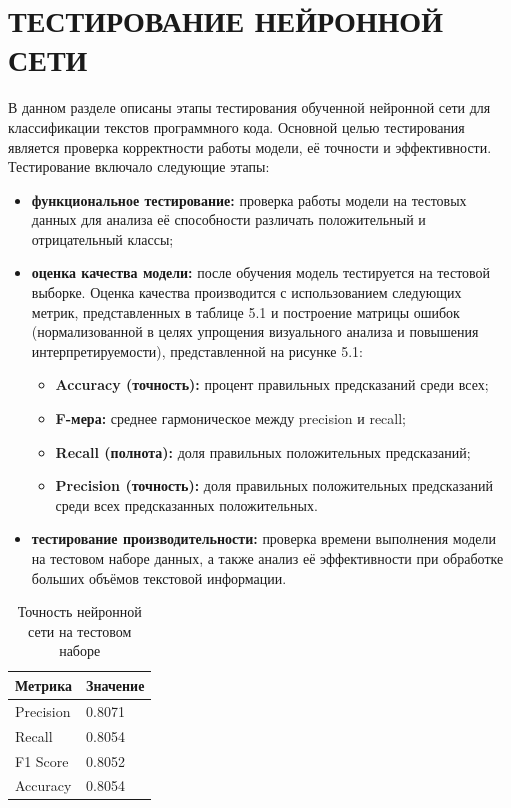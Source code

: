 {\newpage
\section{\MakeUppercase{Тестирование нейронной сети}}

В данном разделе описаны этапы тестирования обученной нейронной сети для классификации текстов программного кода. Основной целью тестирования является проверка корректности работы модели, её точности и эффективности. Тестирование включало следующие этапы:

\begin{itemize}
    \item \textbf{функциональное тестирование:} проверка работы модели на тестовых данных для анализа её способности различать положительный и отрицательный классы;
    \item \textbf{оценка качества модели:} после обучения модель тестируется на тестовой выборке. Оценка качества производится с использованием следующих метрик, представленных в таблице 5.1 и построение матрицы ошибок (нормализованной в целях упрощения визуального анализа и повышения интерпретируемости), представленной на рисунке 5.1:
    \begin{itemize}
        \item \textbf{Accuracy (точность):} процент правильных предсказаний среди всех;
        \item \textbf{F-мера:} среднее гармоническое между precision и recall;
        \item \textbf{Recall (полнота):} доля правильных положительных предсказаний;
        \item \textbf{Precision (точность):} доля правильных положительных предсказаний среди всех предсказанных положительных.
    \end{itemize}
    \item \textbf{тестирование производительности:} проверка времени выполнения модели на тестовом наборе данных, а также анализ её эффективности при обработке больших объёмов текстовой информации.
\end{itemize}
\begin{table}[h]
    \centering
    \renewcommand{\arraystretch}{1.5} %
    \begin{tabular}{|p{3cm}|p{3cm}|} %
        \hline
        \textbf{Метрика} & \textbf{Значение} \\ %
        \hline
        Precision & 0.8071 \\ 
        \hline
        Recall & 0.8054  \\ 
        \hline
        F1 Score & 0.8052  \\ 
        \hline
        Accuracy & 0.8054  \\ 
        \hline
    \end{tabular}
    \caption{Точность нейронной сети на тестовом наборе}
    \label{tab:example}
\end{table}

}
